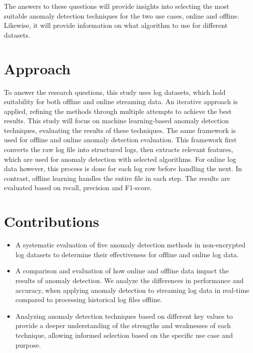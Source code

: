 The answers to these questions will provide insights into selecting the most suitable anomaly detection techniques for the two use cases, online and offline. Likewise, it will provide information on what algorithm to use for different datasets.

\section{Approach}
\label{sec:approach}
To answer the research questions, this study uses log datasets, which hold suitability for both offline and online streaming data. An iterative approach is applied, refining the methods through multiple attempts to achieve the best results. This study will focus on machine learning-based anomaly detection techniques, evaluating the results of these techniques. The same framework is used for offline and online anomaly detection evaluation. This framework first converts the raw log file into structured logs, then extracts relevant features, which are used for anomaly detection with selected algorithms. For online log data however, this process is done for each log row before handling the next. In contrast, offline learning handles the entire file in each step. The results are evaluated based on recall, precision and F1-score.

\section{Contributions}
\label{sec:contributions}

\begin{itemize}
\item A systematic evaluation of five anomaly detection methods in non-encrypted log datasets to determine their effectiveness for offline and online log data.
\item A comparison and evaluation of how online and offline data impact the results of anomaly detection. We analyze the differences in performance and accuracy, when applying anomaly detection to streaming log data in real-time compared to processing historical log files offline. 
\item Analyzing anomaly detection techniques based on different key values to provide a deeper understanding of the strengths and weaknesses of each technique, allowing informed selection based on the specific use case and purpose.
\end{itemize}

